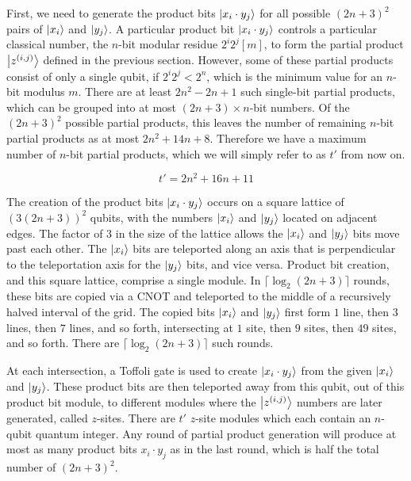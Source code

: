 \documentclass[twoside]{article}
\begin{document}
First, we need to generate the product bits
$\left\vert{x_i\cdot y_j}\right\rangle$ for all possible $(2n+3)^2$ pairs of $\left\vert{x_i}\right\rangle$ and
$\left\vert{y_j}\right\rangle$.
A particular product bit $\left\vert{x_i \cdot y_j}\right\rangle$
controls a particular classical number, the
$n$-bit modular residue $2^i 2^j [m]$, to form the partial product
$\left\vert{z^{(i,j)}}\right\rangle$ defined
in the previous section. However, some of these partial products
consist of only a single qubit, if $2^i 2^j < 2^n$, which is the minimum
value for an $n$-bit modulus $m$. There are at least $2n^2 - 2n + 1$
such single-bit partial products, which can be grouped into at most
$(2n+3)\times n$-bit numbers. Of the $(2n+3)^2$ possible partial products,
this leaves the number of remaining $n$-bit partial products as at most
$2n^2 + 14n +8$. Therefore we have a maximum number of $n$-bit
partial products, which we will simply refer to as $t'$ from now on.

\begin{equation}
t'=2n^2+16n+11
\label{eqn:tprime}
\end{equation}

The creation of the product bits $\left\vert{x_i \cdot y_j}\right\rangle$ occurs on a
square lattice of $(3(2n+3))^2$ qubits, with the numbers $\left\vert{x_i}\right\rangle$ and
$\left\vert{y_j}\right\rangle$ located on adjacent edges. The factor of $3$ in the size of the lattice
allows the $\left\vert{x_i}\right\rangle$ and $\left\vert{y_j}\right\rangle$ bits move past each other.
The $\left\vert{x_i}\right\rangle$ bits are teleported along an axis that is perpendicular to
the teleportation axis for the $\left\vert{y_j}\right\rangle$ bits, and vice versa.
Product bit creation, and this square lattice, comprise a single module.
In $\lceil \log_2 (2n+3) \rceil$
rounds, these bits are copied via a CNOT and teleported to the middle of
a recursively halved interval of the grid. The copied bits $\left\vert{x_i}\right\rangle$ and
$\left\vert{y_j}\right\rangle$
first form $1$ line, then $3$ lines, then $7$ lines, and so forth,
intersecting at $1$ site, then $9$ sites, then $49$ sites, and so forth.
There are $\lceil \log_2 (2n+3) \rceil$ such rounds.

At each intersection, a Toffoli gate is used to create $\left\vert{x_i \cdot y_j}\right\rangle$
from the given $\left\vert{x_i}\right\rangle$ and $\left\vert{y_j}\right\rangle$. These product bits are then
teleported away from this qubit, out of this product bit module, to different
modules where the $\left\vert{z^{(i,j)}}\right\rangle$ numbers are later generated,
called $z$-sites. There are $t'$ $z$-site modules which each contain 
an $n$-qubit quantum integer. Any
round of partial product generation will produce at most as many product
bits $x_i \cdot y_j$ as in the last round, which is half the total number
of $(2n+3)^2$.
\end{document}
